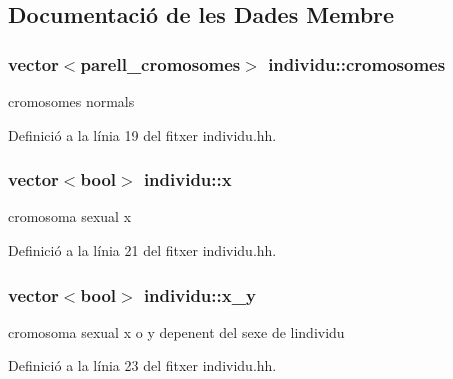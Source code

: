 \subsection{Documentació de les Dades Membre}
\subsubsection[{\texorpdfstring{cromosomes}{cromosomes}}]{\setlength{\rightskip}{0pt plus 5cm}vector$<${\bf parell\+\_\+cromosomes}$>$ individu\+::cromosomes\hspace{0.3cm}{\ttfamily [private]}}\hypertarget{classindividu_ae5e0a83ff9e943cbcdf95b74069ad3a7}{}\label{classindividu_ae5e0a83ff9e943cbcdf95b74069ad3a7}


cromosomes normals 



Definició a la línia 19 del fitxer individu.\+hh.

\subsubsection[{\texorpdfstring{x}{x}}]{\setlength{\rightskip}{0pt plus 5cm}vector$<$bool$>$ individu\+::x\hspace{0.3cm}{\ttfamily [private]}}\hypertarget{classindividu_a3c4abda8daead156b5519f69bd224fa9}{}\label{classindividu_a3c4abda8daead156b5519f69bd224fa9}


cromosoma sexual x 



Definició a la línia 21 del fitxer individu.\+hh.

\subsubsection[{\texorpdfstring{x\+\_\+y}{x_y}}]{\setlength{\rightskip}{0pt plus 5cm}vector$<$bool$>$ individu\+::x\+\_\+y\hspace{0.3cm}{\ttfamily [private]}}\hypertarget{classindividu_a51eb7827fdd5bd5302e3c962fd719fc0}{}\label{classindividu_a51eb7827fdd5bd5302e3c962fd719fc0}


cromosoma sexual x o y depenent del sexe de l\textquotesingle{}individu 



Definició a la línia 23 del fitxer individu.\+hh.

